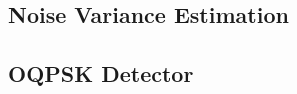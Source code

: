 \subsection{Noise Variance Estimation}
\label{sec:noise_variance_estimation}

\subsection{OQPSK Detector}
\label{sec:oqpsk_detector}

%
%
%
%
%
